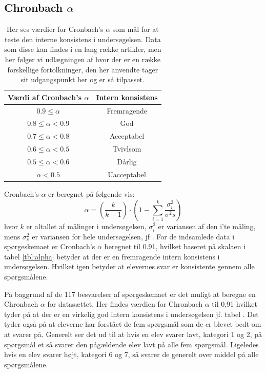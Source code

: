 \subsection*{Chronbach $\alpha$}
\begin{table}[h!]
	\centering
	\caption{Her ses værdier for Cronbach's $\alpha$ som mål for at teste den interne konsistens i undersøgelsen. Data som disse kan findes i en lang række artikler, men her følger vi udlægningen af \citep[Tabel 1, s. 382]{Peterson1994} hvor der er en række forskellige fortolkninger, den her anvendte tager sit udgangspunkt her og er så tilpasset.}
	\label{tbl:alpha}
	\begin{tabular}{@{ } c c @{ }}
		\toprule[2.pt]
		Værdi af Cronbach's $\alpha$ & Intern konsistens\\
		\midrule
		$0.9\leq \alpha$ 		& Fremragende\\
		$0.8\leq \alpha < 0.9$ 	& God\\
		$0.7\leq \alpha < 0.8$	& Acceptabel\\
		$0.6\leq \alpha < 0.5$	& Tvivlsom\\
		$0.5\leq \alpha < 0.6$ 	& Dårlig\\
		$\alpha < 0.5$			& Uacceptabel\\
		\bottomrule[2pt]
	\end{tabular}
\end{table}
Cronbach's  $\alpha$ er beregnet på følgende vis: 
\begin{equation}\label{eq:alpha}
	\alpha = \left(\frac{k}{k-1}\right)\cdot \left(1-\sum_{i=1}^{k} \frac{\sigma^{2}_{i}}{\sigma^{2}{s}}\right)
\end{equation}
hvor $k$ er altallet af målinger i undersøgelsen, $\sigma^{2}_{i}$ er variansen af den i'te måling, mens $\sigma^{2}_{s}$ er variansen for hele undersøgelsen, jf \cite[s.382]{Peterson1994}. For de indsamlede data i spørgeskemaet er Cronbach's $\alpha$ beregnet til 0.91, hvilket baseret på skalaen i tabel \vref{tbl:alpha} betyder at der er en fremragende intern konsistens i undersøgelsen. Hvilket igen betyder at elevernes svar er konsistente gennem alle spørgsmålene. 

På baggrund af de 117 besvarelser af spørgeskemaet er det muligt at beregne en Chronbach $\alpha$ for datasættet. Her findes værdien for Chronbach $\alpha$ til 0,91 hvilket tyder på at der er en virkelig god intern konsistens i undersøgelsen jf. tabel . Det tyder også på at eleverne har forstået de fem spørgsmål som de er blevet bedt om at svarer på.  Generelt ser det ud til at hvis en elev svarer lavt, kategori 1 og 2, på spørgsmål et så svarer den pågældende elev lavt på alle fem spørgsmål. Ligeledes hvis en elev svarer højt, kategori 6 og 7, så svarer de generelt over middel på alle spørgsmålene.

